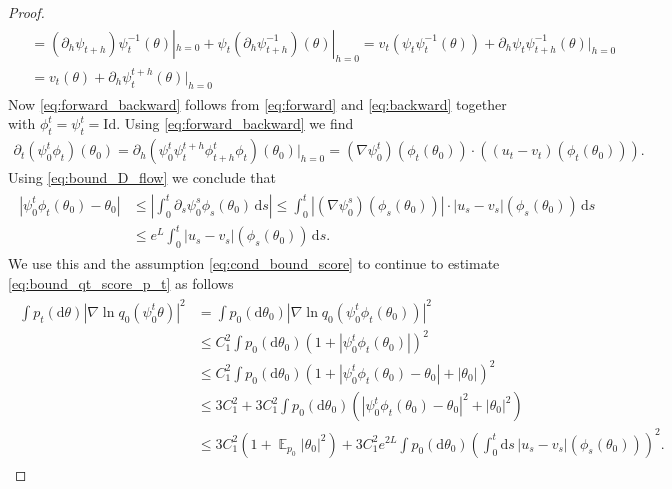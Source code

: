 \documentclass{article}
\theoremstyle{remark}
\DeclareMathOperator{\Ex}{\ensuremath{\mathbb{E}}}
\renewcommand{\d}{\mathrm{d}}
\begin{document}
\begin{proof}
\begin{align}
\begin{split}
   &=
   (\partial_h \psi_{t+h}) \psi_{t}^{-1} (\theta) |_{h=0}
   +  \psi_{t} (\partial_h \psi_{t+h}^{-1}) (\theta) |_{h=0}
   =v_t(\psi_t\psi_{t}^{-1} (\theta)) +   \partial_h \psi_{t} \psi_{t+h}^{-1} (\theta) |_{h=0}
   \\
   &=v_t(\theta) +   \partial_h \psi_{t}^{t+h}  (\theta) |_{h=0}
   \end{split}
\end{align}
Now \eqref{eq:forward_backward} follows
from \eqref{eq:forward} and \eqref{eq:backward}
together with $\phi_t^t=\psi_t^t=\mathrm{Id}$.
Using \eqref{eq:forward_backward} we find
\begin{align}
    \partial_t (\psi^t_0 \phi_t) (\theta_0)
    =
    \partial_h (\psi^t_0 \psi^{t+h}_t \phi_{t+h}^t \phi_t)(\theta_0)|_{h=0}
    =
    (\nabla  \psi^t_0)(\phi_t (\theta_0))\cdot
    \left((u_t-v_t)(\phi_t(\theta_0))\right).
\end{align}
Using \eqref{eq:bound_D_flow} we conclude that
\begin{align}
    \begin{split}
   | \psi^t_0 \phi_t (\theta_0)-\theta_0|
  &\leq 
  \left|
  \int_0^t \partial_s \psi^s_0 \phi_s (\theta_0)\, \d s
  \right|
  \leq 
  \int_0^t 
   |(\nabla  \psi^s_0)(\phi_s (\theta_0))|
  \cdot  |u_s-v_s|(\phi_s(\theta_0))\, \d s
  \\
  & \leq e^L \int_0^t 
   |u_s-v_s|(\phi_s(\theta_0))\, \d s.
   \end{split}
\end{align}
We use this and the assumption \eqref{eq:cond_bound_score} to  continue to estimate \eqref{eq:bound_qt_score_p_t} as follows
\begin{align}
    \begin{split}
     \int p_t(\d \theta) |\nabla \ln q_0(\psi^t_0\theta)|^2
        &= 
    \int p_0(\d \theta_0) |\nabla\ln q_0(\psi^t_0\phi_t(\theta_0))|^2
    \\
    &\leq C_1^2
    \int p_0(\d \theta_0) (1 +|\psi^t_0\phi_t(\theta_0)|)^2
    \\
    &\leq
    C_1^2
    \int p_0(\d \theta_0) (1 +|\psi^t_0\phi_t(\theta_0)-\theta_0| + |\theta_0|)^2
    \\
    &\leq
    3C_1^2 +3C_1^2
    \int p_0(\d \theta_0) \left(|\psi^t_0\phi_t(\theta_0)-\theta_0|^2 + |\theta_0|^2\right)
    \\
    &\leq 
    3C_1^2(1 + \Ex_{p_0}|\theta_0|^2)  +3C_1^2e^{2L}
    \int p_0(\d \theta_0) \left(\int_0^t \d s\, 
    |u_s-v_s|(\phi_s(\theta_0))\right)^2.
    \end{split}

\end{align}
\end{proof}
\end{document}
